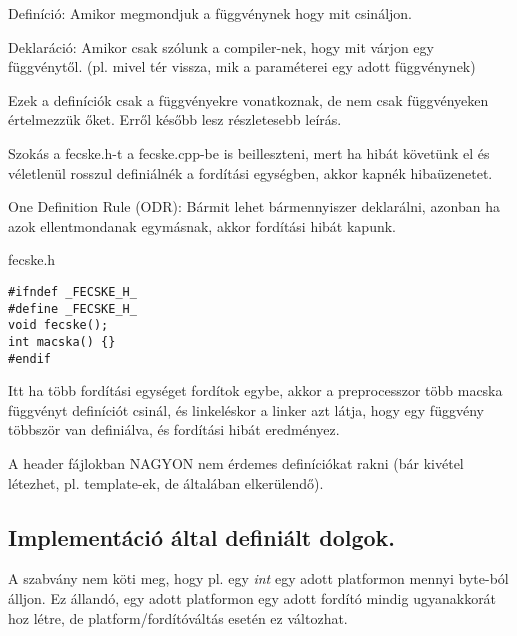 \documentclass[a4paper,11.5pt]{article}
\begin{document}
	\begin{definition}
		Definíció: Amikor megmondjuk a függvénynek hogy mit csináljon.
	\end{definition}
	\begin{definition}
		Deklaráció: Amikor csak szólunk a compiler-nek, hogy mit várjon egy függvénytől. (pl. mivel tér vissza, mik a paraméterei egy adott függvénynek)
	\end{definition}
	\begin{note}
		Ezek a definíciók csak a függvényekre vonatkoznak, de nem csak függvényeken értelmezzük őket. Erről később lesz részletesebb leírás.
	\end{note}
	Szokás a fecske.h-t a fecske.cpp-be is beilleszteni, mert ha hibát követünk el és véletlenül rosszul definiálnék a fordítási egységben, akkor kapnék hibaüzenetet.
	\begin{definition}
		One Definition Rule (ODR): Bármit lehet bármennyiszer deklarálni, azonban ha azok ellentmondanak egymásnak, akkor fordítási hibát kapunk.
	\end{definition}
	\begin{example}
		
		fecske.h
		\begin{lstlisting}
#ifndef _FECSKE_H_
#define _FECSKE_H_
void fecske();
int macska() {}
#endif
		\end{lstlisting}
		
		Itt ha több fordítási egységet fordítok egybe, akkor a preprocesszor több macska függvényt definíciót csinál, és linkeléskor a linker azt látja, hogy egy függvény többször van definiálva, és fordítási hibát eredményez.
	\end{example}
	\begin{note}
		A header fájlokban NAGYON nem érdemes definíciókat rakni (bár kivétel létezhet, pl. template-ek, de általában elkerülendő).
	\end{note}
	\subsection{Implementáció által definiált dolgok.}
	A szabvány nem köti meg, hogy pl. egy \textit{int} egy adott platformon mennyi byte-ból álljon. Ez állandó, egy adott platformon egy adott fordító mindig ugyanakkorát hoz létre, de platform/fordítóváltás esetén ez változhat.
\end{document}
